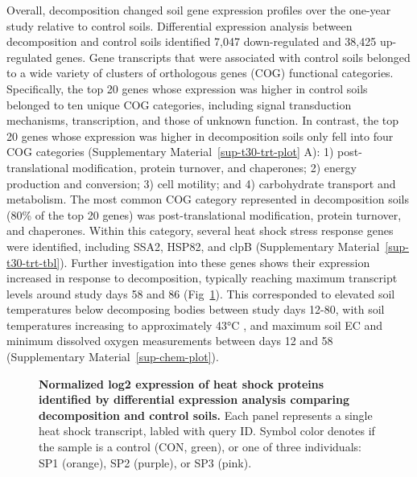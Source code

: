 \documentclass[
  sn-nature,
  lineno, referee]{sn-jnl}
\begin{document}
Overall, decomposition changed soil gene expression profiles over the
one-year study relative to control soils. Differential expression
analysis between decomposition and control soils identified 7,047
down-regulated and 38,425 up-regulated genes. Gene transcripts that were
associated with control soils belonged to a wide variety of clusters of
orthologous genes (COG) functional categories. Specifically, the top 20
genes whose expression was higher in control soils belonged to ten
unique COG categories, including signal transduction mechanisms,
transcription, and those of unknown function. In contrast, the top 20
genes whose expression was higher in decomposition soils only fell into
four COG categories (Supplementary Material~\ref{sup-t30-trt-plot} A):
1) post-translational modification, protein turnover, and chaperones; 2)
energy production and conversion; 3) cell motility; and 4) carbohydrate
transport and metabolism. The most common COG category represented in
decomposition soils (80\% of the top 20 genes) was post-translational
modification, protein turnover, and chaperones. Within this category,
several heat shock stress response genes were identified, including
SSA2, HSP82, and clpB (Supplementary Material~\ref{sup-t30-trt-tbl}).
Further investigation into these genes shows their expression increased
in response to decomposition, typically reaching maximum transcript
levels around study days 58 and 86 (Fig~\ref{fig-heatshock}). This
corresponded to elevated soil temperatures below decomposing bodies
between study days 12-80, with soil temperatures increasing to
approximately 43°C \citep{taylor_transient_2024}, and maximum soil EC
and minimum dissolved oxygen measurements between days 12 and 58
(Supplementary Material~\ref{sup-chem-plot}).

\begin{figure}[!h]
\caption{{\bf Normalized log2 expression of heat shock proteins identified by differential expression analysis comparing decomposition and control soils.}
Each panel represents a single heat shock transcript, labled with query ID. Symbol color denotes if the sample is a control (CON, green), or one of three individuals: SP1 (orange), SP2 (purple), or SP3 (pink).}
\label{fig-heatshock}
\end{figure}
\end{document}
